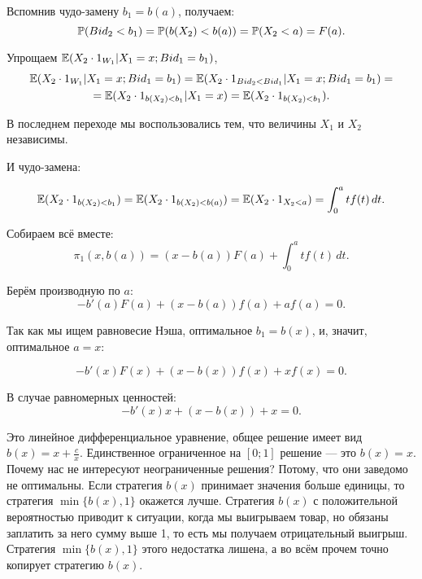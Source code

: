 \begin{myex}
Вспомнив чудо-замену $ b_{1}=b(a) $, получаем:
\begin{equation}
\P(Bid_{2}<b_{1})=\P(b(X_{2})<b(a))=\P(X_{2}<a)=F(a).
\end{equation}

Упрощаем $ \E(X_{2}\cdot 1_{W_{1}}|X_{1}=x; Bid_{1}=b_{1}) $,
\begin{multline}
\E(X_{2}\cdot 1_{W_{1}}|X_{1}=x; Bid_{1}=b_{1})=\E(X_{2}\cdot 1_{Bid_{2}<Bid_{1}}|X_{1}=x; Bid_{1}=b_{1})=\\
=\E(X_{2}\cdot 1_{b(X_{2})<b_{1}}|X_{1}=x)=\E(X_{2}\cdot 1_{b(X_{2})<b_{1}}).
\end{multline}

В последнем переходе мы воспользовались тем, что величины $ X_{1} $ и $ X_{2} $ независимы.

И чудо-замена: 

\begin{equation}
\E(X_{2}\cdot 1_{b(X_{2})<b_{1}})=\E(X_{2}\cdot 1_{b(X_{2})<b(a)})=\E(X_{2}\cdot 1_{X_{2}<a})=\int_{0}^{a}tf(t) \, dt.
\end{equation}

Собираем всё вместе:
\begin{equation}
\pi_{1}(x,b(a))=(x-b(a))F(a)+\int_{0}^{a}tf(t) \, dt.
\end{equation}

Берём производную по $ a $:
\begin{equation}
-b'(a)F(a)+(x-b(a))f(a)+af(a)=0.
\end{equation}

Так как мы ищем равновесие Нэша, оптимальное $b_{1}=b(x)$, и, значит, оптимальное $ a=x $:

\begin{equation}
-b'(x)F(x)+(x-b(x))f(x)+xf(x)=0.
\end{equation}

В случае равномерных ценностей:
\begin{equation}
-b'(x)x+(x-b(x))+x=0.
\end{equation}

Это линейное дифференциальное уравнение, общее решение имеет вид $ b(x)=x+\frac{c}{x} $. Единственное ограниченное на $ [0;1] $ решение — это $ b(x)=x $. Почему нас не интересуют неограниченные решения? Потому, что они заведомо не оптимальны. Если стратегия $ b(x) $ принимает значения больше единицы, то стратегия $ \min\{b(x),1\} $ окажется лучше. Стратегия $b(x)$ с положительной вероятностью приводит к си\-туа\-ции, когда мы выигрываем товар, но обязаны заплатить за него сумму выше 1, то есть мы получаем отрицательный выигрыш. Стратегия $\min\{b(x), 1\}$ этого недостатка лишена, а во всём прочем точно копирует стратегию $b(x)$.

\end{myex}


